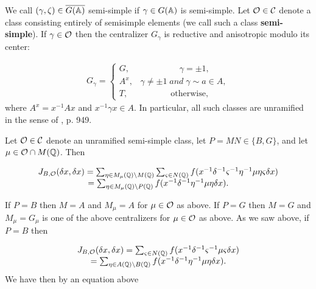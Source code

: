 We call $(\gamma ,\zeta)\in \overline{G({\Bbb{A}})}$
semi-simple if $\gamma\in G({\Bbb{A}})$ is semi-simple.
Let ${\cal{O}}\in \mathcal{C}$ denote a
class consisting entirely of semisimple
elements (we call such a class \textbf{semi-simple}).
If $\gamma \in {\cal{O}}$
then the centralizer $G_\gamma $ is reductive and anisotropic modulo its
center:

\begin{equation}
\begin{array}{c}
G_\gamma =\left\{ 
\begin{array}{c}
G,\;\;\;\;\;\;\;\;\;\;\;\;\;\;\;\;\;\;\;\;\;\gamma =\pm 1, \\ 
A^x,\;\;\;\gamma \neq \pm 1\;and\;\gamma \sim a\in A, \\ 
T,\;\;\;\;\;\;\;\;\;\;\;\;\;\;\;\;\;\;\mathrm{otherwise},
\end{array}
\right.
\end{array}
\end{equation}
where $A^x=x^{-1}Ax$ and $x^{-1}\gamma x\in A$.
In particular, all such classes are unramified in the sense of
\cite{A2}, p. 949.

Let ${\cal{O}}\in \mathcal{C}$ denote an unramified
semi-simple class, let $P=MN\in\{B,G\}$, and let
$\mu \in {\cal{O}}\cap M({\Bbb{Q}})$.
Then

\begin{equation}
\begin{array}{c}
J_{B,{\cal{O}}}(\delta x,\delta x)
=\sum_{\eta \in M_\mu ( {\Bbb{Q}})\backslash M(\Bbb{Q})}
\sum_{\varsigma \in N({\Bbb{Q}})}
f(x^{-1}\delta ^{-1}\varsigma ^{-1}\eta^{-1}\mu \eta \varsigma \delta x) \\ 
=\sum_{\eta \in M_\mu ({\Bbb{Q}})\backslash P({\Bbb{Q}})}
f(x^{-1}\delta^{-1}\eta ^{-1}\mu \eta \delta x).
\end{array}
\end{equation}

If $P=B$ then $M=A$ and $M_\mu =A$ for
$\mu \in {\cal{O}}$ as above. If $P=G$ then
$M=G$ and $M_\mu =G_\mu $ is one of the above
centralizers for $\mu \in {\cal{O}}$ as
above. As we saw above, if $P=B$ then

\begin{equation}
\begin{array}{c}
J_{B,{\cal{O}}}(\delta x,\delta x)
=\sum_{\varsigma \in N( {\Bbb{Q}})}
f(x^{-1}\delta^{-1}\varsigma ^{-1}\mu \varsigma \delta x) \\ 
=\sum_{\eta \in A({\Bbb{Q}})\backslash B({\Bbb{Q}})}
f(x^{-1}\delta ^{-1}\eta^{-1}\mu \eta \delta x).
\end{array}
\end{equation}
We have then by an equation above

